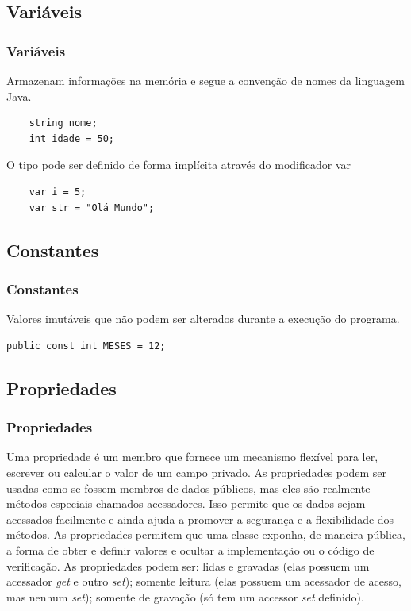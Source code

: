\documentclass{beamer}
\begin{document}
\subsection{Variáveis}

\begin{frame}[fragile]
\frametitle{Variáveis}
\begin{outline}
	\1 Armazenam informações na memória e segue a convenção de nomes da linguagem Java.
	\2 [Ex.:] \begin{lstlisting}
	string nome;
	int idade = 50;
	\end{lstlisting}
	\1 O tipo pode ser definido de forma implícita através do modificador var
	\2 [Ex.:] \begin{lstlisting}
	var i = 5;
	var str = "Olá Mundo";
	\end{lstlisting}
	
\end{outline}
\end{frame}


\subsection{Constantes}

\begin{frame}[fragile]
\frametitle{Constantes}
\begin{outline}
	\1 Valores imutáveis que não podem ser alterados durante a execução do programa.
	\1 [Ex.:] \begin{lstlisting}
public const int MESES = 12;	
	\end{lstlisting}
\end{outline}

\end{frame}

\subsection{Propriedades}

\begin{frame}
\frametitle{Propriedades}
\begin{outline}
\1 Uma propriedade é um membro que fornece um mecanismo flexível para ler, escrever ou calcular o valor de um campo privado.
\1 As propriedades podem ser usadas como se fossem membros de dados públicos, mas eles são realmente métodos especiais chamados acessadores.
\1 Isso permite que os dados sejam acessados facilmente e ainda ajuda a promover a segurança e a flexibilidade dos métodos.
\1 As propriedades permitem que uma classe exponha, de maneira pública, a forma de obter e definir valores e ocultar a implementação ou o código de verificação.
\1 As propriedades podem ser:
	\2 lidas e gravadas (elas possuem um acessador \textit{get} e outro \textit{set});
	\2 somente leitura (elas possuem um acessador de acesso, mas nenhum \textit{set});
	\2 somente de gravação (só tem um accessor \textit{set} definido).
\end{outline}
\end{frame}
\end{document}
